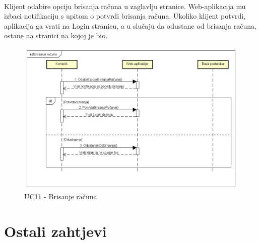 				\noindent {}\\
				{Klijent odabire opciju brisanja računa u zaglavlju stranice. Web-aplikacija mu izbaci notifikaciju s upitom o potvrdi brisanja računa. Ukoliko klijent potvrdi, aplikacija ga vrati na Login stranicu, a u slučaju da odustane od brisanja računa, ostane na stranici na kojoj je bio. }\\
				
				\begin{figure}[H]
					\centering
					\includegraphics[width=1\linewidth]{"slike/UC11-sekvencijski"}
					\caption{UC11 - Brisanje računa}
					\label{fig:UC-brisanje-racuna}
				\end{figure}
				
				
		\section{Ostali zahtjevi}
		
